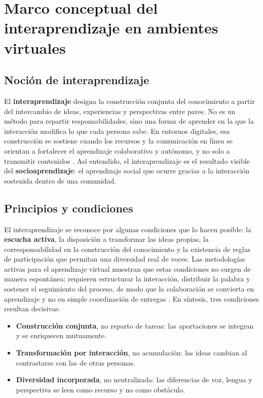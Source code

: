 \documentclass[
  spanish,
  letterpaper, oneside
]{article}
\begin{document}
\section{Marco conceptual del interaprendizaje en ambientes virtuales}

\subsection{Noción de interaprendizaje}

El \textbf{interaprendizaje} designa la construcción conjunta del conocimiento a
partir del intercambio de ideas, experiencias y perspectivas entre pares. No es un
método para repartir responsabilidades, sino una forma de aprender en la que la
interacción modifica lo que cada persona sabe. En entornos digitales, esa
construcción se sostiene cuando los recursos y la comunicación en línea se orientan a
fortalecer el aprendizaje colaborativo y autónomo, y no solo a transmitir contenidos
\citep{bertely2011interaprendizajes}. Así entendido, el interaprendizaje es el
resultado visible del \textbf{socioaprendizaje}: el aprendizaje social que ocurre
gracias a la interacción sostenida dentro de una comunidad.

\subsection{Principios y condiciones}

El interaprendizaje se reconoce por algunas condiciones que lo hacen posible: la
\textbf{escucha activa}, la disposición a transformar las ideas propias, la
corresponsabilidad en la construcción del conocimiento y la existencia de reglas de
participación que permitan una diversidad real de voces. Las metodologías activas para
el aprendizaje virtual muestran que estas condiciones no surgen de manera espontánea:
requieren estructurar la interacción, distribuir la palabra y sostener el seguimiento
del proceso, de modo que la colaboración se convierta en aprendizaje y no en simple
coordinación de entregas \citep{diazAlonso2011construccion}. En síntesis, tres
condiciones resultan decisivas:

\begin{itemize}[leftmargin=1.6em,itemsep=0.3em]
  \item \textbf{Construcción conjunta}, no reparto de tareas: las aportaciones se
  integran y se enriquecen mutuamente.
  \item \textbf{Transformación por interacción}, no acumulación: las ideas cambian al
  contrastarse con las de otras personas.
  \item \textbf{Diversidad incorporada}, no neutralizada: las diferencias de voz,
  lengua y perspectiva se leen como recurso y no como obstáculo.
\end{itemize}
\end{document}
